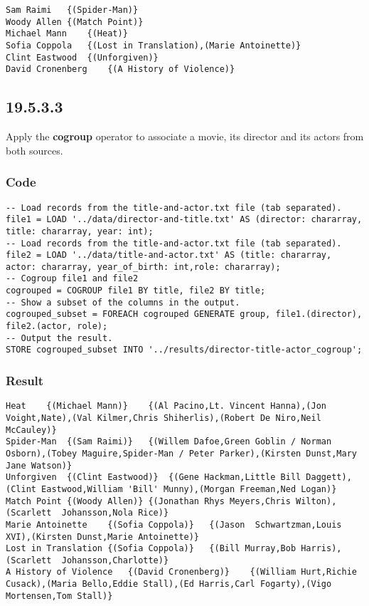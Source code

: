 \documentclass[a4paper, notitlepage]{article}
\begin{document}
\begin{lstlisting}
Sam Raimi	{(Spider-Man)}
Woody Allen	{(Match Point)}
Michael Mann	{(Heat)}
Sofia Coppola	{(Lost in Translation),(Marie Antoinette)}
Clint Eastwood	{(Unforgiven)}
David Cronenberg	{(A History of Violence)}
\end{lstlisting}

\subsection{19.5.3.3}

Apply the \textbf{cogroup} operator to associate a movie, its director and its actors from both sources.

\subsubsection{Code}

\begin{lstlisting}
-- Load records from the title-and-actor.txt file (tab separated).
file1 = LOAD '../data/director-and-title.txt' AS (director: chararray, title: chararray, year: int);
-- Load records from the title-and-actor.txt file (tab separated).
file2 = LOAD '../data/title-and-actor.txt' AS (title: chararray, actor: chararray, year_of_birth: int,role: chararray);
-- Cogroup file1 and file2
cogrouped = COGROUP file1 BY title, file2 BY title;
-- Show a subset of the columns in the output.
cogrouped_subset = FOREACH cogrouped GENERATE group, file1.(director), file2.(actor, role);
-- Output the result.
STORE cogrouped_subset INTO '../results/director-title-actor_cogroup';
\end{lstlisting}

\subsubsection{Result}

\begin{lstlisting}
Heat	{(Michael Mann)}	{(Al Pacino,Lt. Vincent Hanna),(Jon Voight,Nate),(Val Kilmer,Chris Shiherlis),(Robert De Niro,Neil McCauley)}
Spider-Man	{(Sam Raimi)}	{(Willem Dafoe,Green Goblin / Norman Osborn),(Tobey Maguire,Spider-Man / Peter Parker),(Kirsten Dunst,Mary Jane Watson)}
Unforgiven	{(Clint Eastwood)}	{(Gene Hackman,Little Bill Daggett),(Clint Eastwood,William 'Bill' Munny),(Morgan Freeman,Ned Logan)}
Match Point	{(Woody Allen)}	{(Jonathan Rhys Meyers,Chris Wilton),(Scarlett  Johansson,Nola Rice)}
Marie Antoinette	{(Sofia Coppola)}	{(Jason  Schwartzman,Louis XVI),(Kirsten Dunst,Marie Antoinette)}
Lost in Translation	{(Sofia Coppola)}	{(Bill Murray,Bob Harris),(Scarlett  Johansson,Charlotte)}
A History of Violence	{(David Cronenberg)}	{(William Hurt,Richie Cusack),(Maria Bello,Eddie Stall),(Ed Harris,Carl Fogarty),(Vigo Mortensen,Tom Stall)}
\end{lstlisting}
\end{document}
